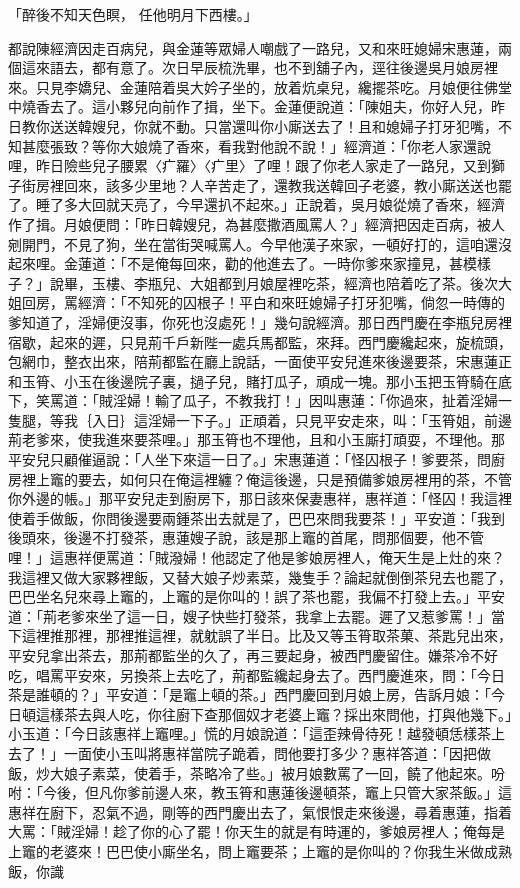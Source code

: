 「醉後不知天色瞑，  任他明月下西樓。」

都說陳經濟因走百病兒，與金蓮等眾婦人嘲戲了一路兒，又和來旺媳婦宋惠蓮，兩個這來語去，都有意了。次日早辰梳洗畢，也不到舖子內，逕往後邊吳月娘房裡來。只見李嬌兒、金蓮陪着吳大妗子坐的，放着炕桌兒，纔擺茶吃。月娘便往佛堂中燒香去了。這小夥兒向前作了揖，坐下。金蓮便說道：「陳姐夫，你好人兒，昨日教你送送韓嫂兒，你就不動。只當還叫你小廝送去了！且和媳婦子打牙犯嘴，不知甚麼張致？等你大娘燒了香來，看我對他說不說！」經濟道：「你老人家還說哩，昨日險些兒子腰累〈疒羅〉〈疒里〉了哩！跟了你老人家走了一路兒，又到獅子街房裡回來，該多少里地？人辛苦走了，還教我送韓回子老婆，教小廝送送也罷了。睡了多大回就天亮了，今早還扒不起來。」正說着，吳月娘從燒了香來，經濟作了揖。月娘便問：「昨日韓嫂兒，為甚麼撒酒風罵人？」經濟把因走百病，被人剜開門，不見了狗，坐在當街哭喊罵人。今早他漢子來家，一頓好打的，這咱還沒起來哩。金蓮道：「不是俺每回來，勸的他進去了。一時你爹來家撞見，甚模樣子？」說畢，玉樓、李瓶兒、大姐都到月娘屋裡吃茶，經濟也陪着吃了茶。後次大姐回房，罵經濟：「不知死的囚根子！平白和來旺媳婦子打牙犯嘴，倘忽一時傳的爹知道了，淫婦便沒事，你死也沒處死！」幾句說經濟。那日西門慶在李瓶兒房裡宿歇，起來的遲，只見荊千戶新陛一處兵馬都監，來拜。西門慶纔起來，旋梳頭，包網巾，整衣出來，陪荊都監在廳上說話，一面使平安兒進來後邊要茶，宋惠蓮正和玉筲、小玉在後邊院子裏，撾子兒，賭打瓜子，頑成一塊。那小玉把玉筲騎在底下，笑罵道：「賊淫婦！輸了瓜子，不教我打！」因叫惠蓮：「你過來，扯着淫婦一隻腿，等我｛入日｝這淫婦一下子。」正頑着，只見平安走來，叫：「玉筲姐，前邊荊老爹來，使我進來要茶哩。」那玉筲也不理他，且和小玉廝打頑耍，不理他。那平安兒只顧催逼說：「人坐下來這一日了。」宋惠蓮道：「怪囚根子！爹要茶，問廚房裡上竈的要去，如何只在俺這裡纏？俺這後邊，只是預備爹娘房裡用的茶，不管你外邊的帳。」那平安兒走到廚房下，那日該來保妻惠祥，惠祥道：「怪囚！我這裡使着手做飯，你問後邊要兩鍾茶出去就是了，巴巴來問我要茶！」平安道：「我到後頭來，後邊不打發茶，惠蓮嫂子說，該是那上竈的首尾，問那個要，他不管哩！」這惠祥便罵道：「賊潑婦！他認定了他是爹娘房裡人，俺天生是上灶的來？我這裡又做大家夥裡飯，又替大娘子炒素菜，幾隻手？論起就倒倒茶兒去也罷了，巴巴坐名兒來尋上竈的，上竈的是你叫的！誤了茶也罷，我偏不打發上去。」平安道：「荊老爹來坐了這一日，嫂子快些打發茶，我拿上去罷。遲了又惹爹罵！」當下這裡推那裡，那裡推這裡，就躭誤了半日。比及又等玉筲取茶菓、茶匙兒出來，平安兒拿出茶去，那荊都監坐的久了，再三要起身，被西門慶留住。嫌茶冷不好吃，唱罵平安來，另換茶上去吃了，荊都監纔起身去了。西門慶進來，問：「今日茶是誰頓的？」平安道：「是竈上頓的茶。」西門慶回到月娘上房，告訴月娘：「今日頓這樣茶去與人吃，你往廚下查那個奴才老婆上竈？採出來問他，打與他幾下。」小玉道：「今日該惠祥上竈哩。」慌的月娘說道：「這歪辣骨待死！越發頓恁樣茶上去了！」一面使小玉叫將惠祥當院子跪着，問他要打多少？惠祥答道：「因把做飯，炒大娘子素菜，使着手，茶略冷了些。」被月娘數罵了一回，饒了他起來。吩咐：「今後，但凡你爹前邊人來，教玉筲和惠蓮後邊頓茶，竈上只管大家茶飯。」這惠祥在廚下，忍氣不過，剛等的西門慶出去了，氣恨恨走來後邊，尋着惠蓮，指着大罵：「賊淫婦！趁了你的心了罷！你天生的就是有時運的，爹娘房裡人；俺每是上竈的老婆來！巴巴使小廝坐名，問上竈要茶；上竈的是你叫的？你我生米做成熟飯，你識
